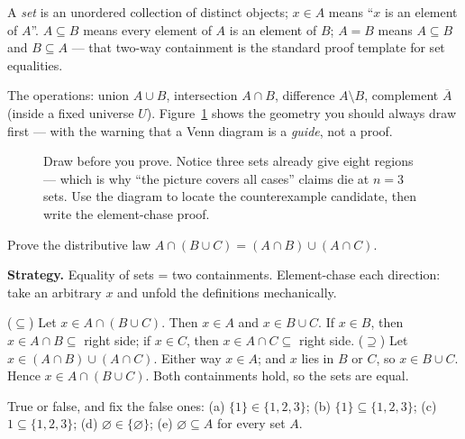 \begin{definition}
A \emph{set} is an unordered collection of distinct objects; $x \in A$ means
``$x$ is an element of $A$''. $A \subseteq B$ means every element of $A$ is an
element of $B$; $A = B$ means $A \subseteq B$ and $B \subseteq A$ --- that
two-way containment is the standard proof template for set equalities.
\end{definition}

The operations: union $A \cup B$, intersection $A \cap B$, difference
$A \setminus B$, complement $\overline{A}$ (inside a fixed universe $U$).
Figure~\ref{fig:venn} shows the geometry you should always draw first ---
with the warning that a Venn diagram is a \emph{guide}, not a proof.

\begin{figure}[ht]\centering

\caption{Draw before you prove. Notice three sets already give eight regions
--- which is why ``the picture covers all cases'' claims die at $n=3$ sets.
Use the diagram to locate the counterexample candidate, then write the
element-chase proof.}
\label{fig:venn}
\end{figure}

\begin{example}
Prove the distributive law $A \cap (B \cup C) = (A \cap B) \cup (A \cap C)$.
\par\smallskip
\textbf{Strategy.} Equality of sets = two containments. Element-chase each
direction: take an arbitrary $x$ and unfold the definitions mechanically.
\par\smallskip
\begin{solution}
($\subseteq$) Let $x \in A \cap (B \cup C)$. Then $x \in A$ and
$x \in B \cup C$. If $x \in B$, then $x \in A \cap B \subseteq$ right side; if
$x \in C$, then $x \in A \cap C \subseteq$ right side.
($\supseteq$) Let $x \in (A \cap B) \cup (A \cap C)$. Either way $x \in A$;
and $x$ lies in $B$ or $C$, so $x \in B \cup C$. Hence
$x \in A \cap (B \cup C)$. Both containments hold, so the sets are equal.
\end{solution}
\end{example}

\begin{exercise}[easy]\label{exr:in-vs-sub}
True or false, and fix the false ones: (a) $\{1\} \in \{1,2,3\}$;
(b) $\{1\} \subseteq \{1,2,3\}$; (c) $1 \subseteq \{1,2,3\}$;
(d) $\varnothing \in \{\varnothing\}$; (e) $\varnothing \subseteq A$ for
every set $A$.
\end{exercise}

